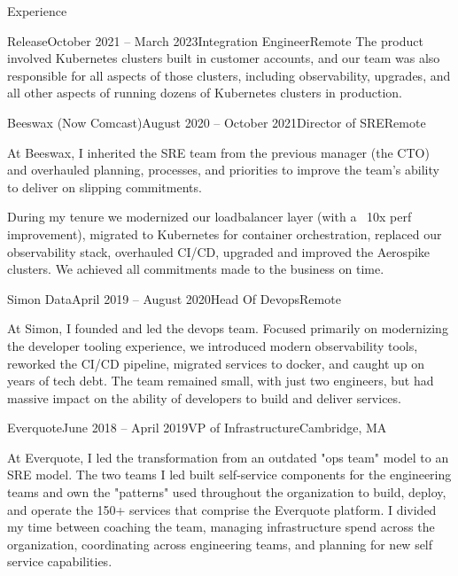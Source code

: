 \documentclass{resume} %
\begin{document}
\begin{rSection}{Experience}
\begin{rSubsection}{Release}{October 2021 -- March 2023}{Integration Engineer}{Remote}
The product involved Kubernetes clusters built in customer accounts, and our team was also responsible for all aspects of those clusters, including observability, upgrades, and all other aspects of running dozens of Kubernetes clusters in production.
\end{rSubsection}

\begin{rSubsection}{Beeswax (Now Comcast)}{August 2020 -- October 2021}{Director of SRE}{Remote}
\item[]At Beeswax, I inherited the SRE team from the previous manager (the CTO) and overhauled planning, processes, and priorities to improve the team's ability to deliver on slipping commitments.

During my tenure we modernized our loadbalancer layer (with a ~10x perf improvement), migrated to Kubernetes for container orchestration, replaced our observability stack, overhauled CI/CD, upgraded and improved the Aerospike clusters.  We achieved all commitments made to the business on time.
\end{rSubsection}

\begin{rSubsection}{Simon Data}{April 2019 -- August 2020}{Head Of Devops}{Remote}
\item[]At Simon, I founded and led the devops team. Focused primarily on modernizing the developer tooling experience, we introduced modern observability tools, reworked the CI/CD pipeline, migrated services to docker, and caught up on years of tech debt.  The team remained small, with just two engineers, but had massive impact on the ability of developers to build and deliver services.
\end{rSubsection}

\begin{rSubsection}{Everquote}{June 2018 -- April 2019}{VP of Infrastructure}{Cambridge, MA}
\item[] At Everquote, I led the transformation from an outdated "ops team" model to an
  SRE model.  The two teams I led built self-service components for the engineering
  teams and own the "patterns" used throughout the organization to build, deploy, and
  operate the 150+ services that comprise the Everquote platform.  I divided my time
  between coaching the team, managing infrastructure spend across the
  organization, coordinating across engineering teams, and planning for new
  self service capabilities.
\end{rSubsection}


\end{rSection}
\end{document}
